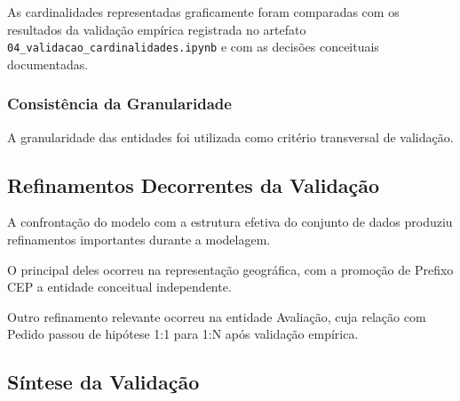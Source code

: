 \documentclass[12pt,a4paper]{article}
\begin{document}
	As cardinalidades representadas graficamente foram comparadas com os resultados
	da validação empírica registrada no artefato
	\nolinkurl{04_validacao_cardinalidades.ipynb} e com as decisões conceituais
	documentadas.
	
	\subsubsection{Consistência da Granularidade}
	
	A granularidade das entidades foi utilizada como critério transversal de
	validação.
	
	\subsection{Refinamentos Decorrentes da Validação}
	
	A confrontação do modelo com a estrutura efetiva do conjunto de dados produziu
	refinamentos importantes durante a modelagem.
	
	O principal deles ocorreu na representação geográfica, com a promoção de
	Prefixo CEP a entidade conceitual independente.
	
	Outro refinamento relevante ocorreu na entidade Avaliação, cuja relação com
	Pedido passou de hipótese 1:1 para 1:N após validação empírica.
	
	\subsection{Síntese da Validação}
	
\end{document}

